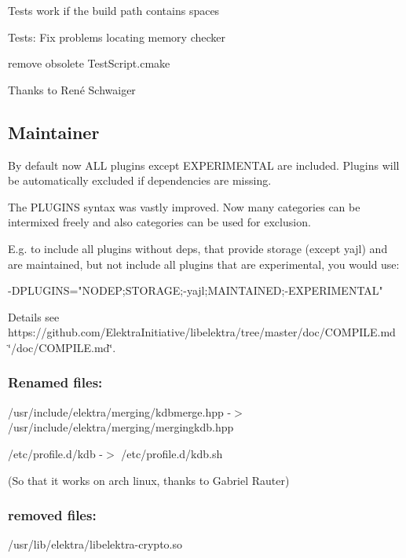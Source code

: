 \begin{DoxyItemize}
\item Tests work if the build path contains spaces
\item Tests\+: Fix problems locating memory checker
\item remove obsolete Test\+Script.\+cmake
\end{DoxyItemize}

Thanks to René Schwaiger

\subsection*{Maintainer}

By default now A\+L\+L plugins except E\+X\+P\+E\+R\+I\+M\+E\+N\+T\+A\+L are included. Plugins will be automatically excluded if dependencies are missing.

The P\+L\+U\+G\+I\+N\+S syntax was vastly improved. Now many categories can be intermixed freely and also categories can be used for exclusion.

E.\+g. to include all plugins without deps, that provide storage (except yajl) and are maintained, but not include all plugins that are experimental, you would use\+: \begin{DoxyVerb}    -DPLUGINS="NODEP;STORAGE;-yajl;MAINTAINED;-EXPERIMENTAL"
\end{DoxyVerb}


Details see https\+://github.com/\+Elektra\+Initiative/libelektra/tree/master/doc/\+C\+O\+M\+P\+I\+L\+E.\+md \char`\"{}/doc/\+C\+O\+M\+P\+I\+L\+E.\+md\char`\"{}.

\subsubsection*{Renamed files\+:}

/usr/include/elektra/merging/kdbmerge.hpp -\/$>$ /usr/include/elektra/merging/mergingkdb.hpp

/etc/profile.d/kdb -\/$>$ /etc/profile.d/kdb.\+sh

(So that it works on arch linux, thanks to Gabriel Rauter)

\subsubsection*{removed files\+:}


\begin{DoxyItemize}
\item /usr/lib/elektra/libelektra-\/crypto.so
\end{DoxyItemize}

